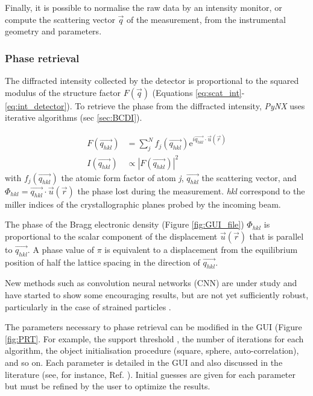 Finally, it is possible to normalise the raw data by an intensity monitor, or compute the scattering vector $\vec{q}$ of the measurement, from the instrumental geometry and parameters.

\subsubsection{Phase retrieval}
The diffracted intensity collected by the detector is proportional to the squared modulus of the structure factor $F(\vec{q})$ (Equations \ref{eq:scat_int}-\ref{eq:int_detector}).
To retrieve the phase from the diffracted intensity, \textit{PyNX} uses iterative algorithms (sec \ref{sec:BCDI}).

\begin{align}
    F(\vec{q_{hkl}}) & = \sum_j^N f_j (\vec{q_{hkl}}) \mathrm{e}^{i\vec{q_{hkl}}\cdot\vec{u}(\vec{r})}    \label{eq:scat_int} \\
    I(\vec{q_{hkl}}) & \propto |F(\vec{q_{hkl}})|^2     \label{eq:int_detector}
\end{align}
with $f_j (\vec{q_{hkl}})$ the atomic form factor of atom \textit{j}, $\vec{q_{hkl}}$ the scattering vector, and $\Phi_{hkl} = \vec{q_{hkl}}\cdot\vec{u}(\vec{r})$ the phase lost during the measurement. \textit{hkl} correspond to the miller indices of the crystallographic planes probed by the incoming beam.

The phase of the Bragg electronic density (Figure \ref{fig:GUI_file}) $\Phi_{hkl}$ is proportional to the scalar component of the displacement $\vec{u}(\vec{r})$ that is parallel to $ \vec{q_{hkl}}$. A phase value of $\pi$ is equivalent to a displacement from the equilibrium position of half the lattice spacing in the direction of $\vec{q_{hkl}}$.

New methods such as convolution neural networks (CNN) are under study and have started to show some encouraging results, but are not yet sufficiently robust, particularly in the case of strained particles \cite{cherukara_real-time_2018,chan_rapid_2021,Wu2021}.

The parameters necessary to phase retrieval can be modified in the GUI (Figure \ref{fig:PRT}.
For example, the support threshold
, the number of iterations for each algorithm, the object initialisation procedure (square, sphere, auto-correlation), and so on.
Each parameter is detailed in the GUI and also discussed in the literature (see, for instance, Ref. \cite{fienup_phase_1982,fienup_reconstruction_1978,marchesini_publishers_2007,pynx2020operators}). Initial guesses are given for each parameter but must be refined by the user to optimize the results.

